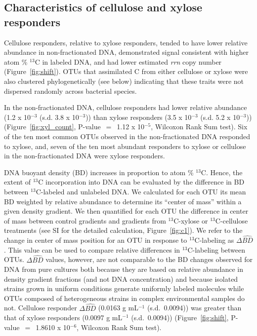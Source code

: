 \subsection{Characteristics of cellulose and xylose responders}
Cellulose responders, relative to xylose responders, tended to have lower
relative abundance in non-fractionated DNA, demonstrated signal consistent with
higher atom \% $^{13}$C in labeled DNA, and had lower estimated \textit{rrn}
copy number (Figure~\ref{fig:shift}). OTUs that assimilated C from either
cellulose or xylose were also clustered phylogenetically (see below) indicating
that these traits were not dispersed randomly across bacterial species. 

In the non-fractionated DNA, cellulose
responders had lower relative abundance (1.2 x 10$^{-3}$ (s.d. 3.8
x 10$^{-3}$)) than xylose responders (3.5 x 10$^{-3}$ (s.d. 5.2 x 10$^{-3}$))
(Figure~\ref{fig:xyl_count}, P-value~$=$~1.12 x 10$^{-5}$, Wilcoxon Rank Sum
test). Six of the ten most common OTUs observed in the non-fractionated DNA
responded to xylose, and, seven of the ten most abundant responders to xylose
or cellulose in the non-fractionated DNA were xylose responders.

DNA buoyant density (BD) increases in proportion to atom \% $^{13}$C.
Hence, the extent of $^{13}$C incorporation into DNA can be evaluated by
the difference in BD between $^{13}$C-labeled and unlabeled DNA. We
calculated for each OTU its mean BD weighted by relative abundance to
determine its ``center of mass'' within a given density gradient. We then
quantified for each OTU the difference in center of mass between control
gradients and gradients from $^{13}$C-xylose or $^{13}$C-cellulose treatments
(see SI for the detailed calculation, Figure~\ref{fig:c1}). We refer to the
change in center of mass position for an OTU in response to $^{13}$C-labeling
as $\Delta\hat{BD}$. This value can be used to compare relative
differences in $^{13}$C-labeling between OTUs. $\Delta\hat{BD}$ values,
however, are not comparable to the BD changes observed for DNA from pure
cultures both because they are  based on relative abundance in density gradient
fractions (and not DNA concentration) and because isolated strains grown in
uniform conditions generate uniformly labeled molecules while OTUs composed of
heterogeneous strains in complex environmental samples do not. Cellulose
responder $\Delta\hat{BD}$ (0.0163 g mL$^{-1}$ (s.d.~0.0094)) was greater than
that of xylose responders (0.0097 g mL$^{-1}$ (s.d.~0.0094))
(Figure~\ref{fig:shift}, P-value~$=$~1.8610 x 10$^{-6}$, Wilcoxon Rank Sum
test). 

